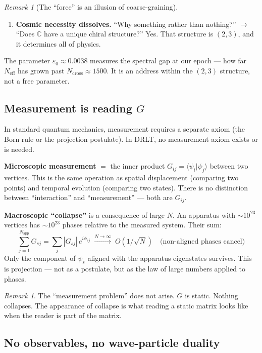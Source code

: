 \documentclass[12pt]{article}
\theoremstyle{remark}
\newtheorem{remark}[theorem]{Remark}
\theoremstyle{definition}
\newcommand{\CC}{\mathbb{C}}
\begin{document}
\begin{remark}[The ``force'' is an illusion of coarse-graining]
\begin{enumerate}
\item \textbf{Cosmic necessity dissolves.} ``Why something rather than nothing?'' $\to$ ``Does $\CC$ have a unique chiral structure?'' Yes. That structure is $(2,3)$, and it determines all of physics.
\end{enumerate}

The parameter $\varepsilon_0 \approx 0.0038$ measures the spectral gap at our epoch --- how far $N_\text{eff}$ has grown past $N_\text{cross} \approx 1500$. It is an address within the $(2,3)$ structure, not a free parameter.

\subsection{Measurement is reading $G$}

In standard quantum mechanics, measurement requires a separate axiom (the Born rule or the projection postulate). In DRLT, no measurement axiom exists or is needed.

\textbf{Microscopic measurement} $=$ the inner product $G_{ij} = \langle\psi_i|\psi_j\rangle$ between two vertices. This is the same operation as spatial displacement (comparing two points) and temporal evolution (comparing two states). There is no distinction between ``interaction'' and ``measurement'' --- both are $G_{ij}$.

\textbf{Macroscopic ``collapse''} is a consequence of large $N$. An apparatus with $\sim\!10^{23}$ vertices has $\sim\!10^{23}$ phases relative to the measured system. Their sum:
\begin{equation}
\sum_{j=1}^{N_\text{app}} G_{sj} = \sum_{j} |G_{sj}|\,e^{i\phi_{sj}} \;\xrightarrow{N \to \infty}\; O(1/\sqrt{N}) \quad\text{(non-aligned phases cancel)}
\end{equation}
Only the component of $\psi_s$ aligned with the apparatus eigenstates survives. This is projection --- not as a postulate, but as the law of large numbers applied to phases.

\begin{remark}
The ``measurement problem'' does not arise. $G$ is static. Nothing collapses. The appearance of collapse is what reading a static matrix looks like when the reader is part of the matrix.
\end{remark}

\subsection{No observables, no wave-particle duality}


\end{remark}
\end{document}
